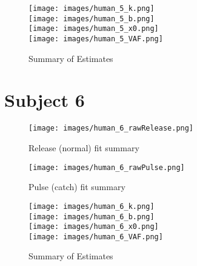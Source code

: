 \documentclass[12pt]{spie}
\begin{document}
\begin{figure}[H]
\begin{center}
\texttt{[image: images/human\_5\_k.png]} \\
\texttt{[image: images/human\_5\_b.png]} \\
\texttt{[image: images/human\_5\_x0.png]} \\
\texttt{[image: images/human\_5\_VAF.png]} \\
\caption[]{Summary of Estimates}
\end{center}
\end{figure}

\section{Subject 6}

\begin{figure}[H]
\begin{center}
\texttt{[image: images/human\_6\_rawRelease.png]}
\caption[]{Release (normal) fit summary}
\end{center}
\end{figure}

\begin{figure}[H]
\begin{center}
\texttt{[image: images/human\_6\_rawPulse.png]}
\caption[]{Pulse (catch) fit summary}
\end{center}
\end{figure}

\begin{figure}[H]
\begin{center}
\texttt{[image: images/human\_6\_k.png]} \\
\texttt{[image: images/human\_6\_b.png]} \\
\texttt{[image: images/human\_6\_x0.png]} \\
\texttt{[image: images/human\_6\_VAF.png]} \\
\caption[]{Summary of Estimates}
\end{center}
\end{figure}


%
%
\end{document}
